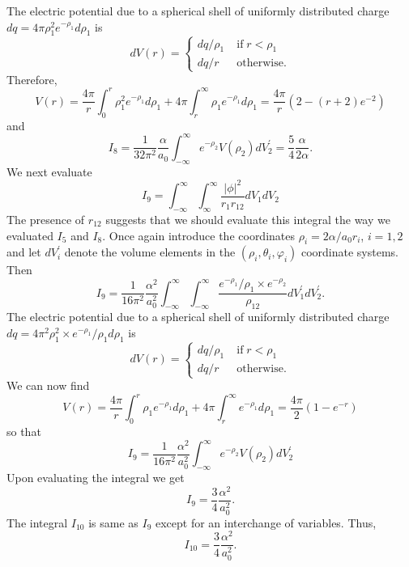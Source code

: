 \documentclass{article}
\numberwithin{equation}{section}
\begin{document}
The electric potential due to a spherical shell of uniformly distributed
charge $dq = 4\pi\rho_1^2 e^{-\rho_1}d\rho_1$ is
\[
dV(r) = \begin{cases}
dq/\rho_1 & \;\text{if}\; r < \rho_1 \\
dq/r &\;\text{otherwise.}
\end{cases}
\]
Therefore,
\[
V(r) = \frac{4\pi}{r}\int_0^r\rho_1^2e^{-\rho_1}d\rho_1 + 4\pi\int_r^\infty
\rho_1 e^{-\rho_1}d\rho_1 = \frac{4\pi}{r}\left(2 - (r+2)e^{-2}\right)
\]
and
\begin{equation}\label{s5e80}
I_8 = \frac{1}{32\pi^2}\frac{\alpha}{a_0}
\int_{-\infty}^\infty e^{-\rho_2}V(\rho_2)dV^\prime_2
= \frac{5}{4}\frac{\alpha}{2\alpha}.
\end{equation}
We next evaluate
\[
I_9 = \int_{-\infty}^\infty\int_{\infty}^\infty \frac{|\phi|^2}{r_1r_{12}}
dV_1dV_2
\]
The presence of $r_{12}$ suggests that we should evaluate this integral 
the way we evaluated $I_5$ and $I_8$. Once again introduce the coordinates
$\rho_i = 2\alpha/a_0 r_i$, $i = 1, 2$ and let $dV^\prime_i$ denote the
volume elements in the $(\rho_i, \theta_i, \varphi_i)$ coordinate systems.
Then
\[
I_9 = \frac{1}{16\pi^2}\frac{\alpha^2}{a_0^2}
\int_{-\infty}^\infty\int_{-\infty}^\infty
\frac{e^{-\rho_1}/\rho_1 \times e^{-\rho_2}}{\rho_{12}}
dV^\prime_1dV^\prime_2.
\]
The electric potential due to a spherical shell of uniformly distributed
charge $dq = 4\pi^2\rho_1^2 \times e^{-\rho_1}/\rho_1 d\rho_1$ is
\[
dV(r) = \begin{cases}
dq/\rho_1 & \;\text{if}\; r < \rho_1 \\
dq/r &\;\text{otherwise.}
\end{cases}
\]
We can now find
\[
V(r) = \frac{4\pi}{r}\int_0^r\rho_1 e^{-\rho_1}d\rho_1
+ 4\pi\int_r^\infty e^{-\rho_1}d\rho_1 = \frac{4\pi}{2}(1 - e^{-r})
\]
so that
\[
I_9 = \frac{1}{16\pi^2}\frac{\alpha^2}{a_0^2}
\int_{-\infty}^\infty e^{-\rho_2}V(\rho_2)dV^\prime_2
\]
Upon evaluating the integral we get
\begin{equation}\label{s5e81}
I_9 = \frac{3}{4}\frac{\alpha^2}{a_0^2}.
\end{equation}
The integral $I_{10}$ is same as $I_9$ except for an interchange of
variables. Thus,
\begin{equation}\label{s5e82}
I_{10} = \frac{3}{4}\frac{\alpha^2}{a_0^2}.
\end{equation}
\end{document}
